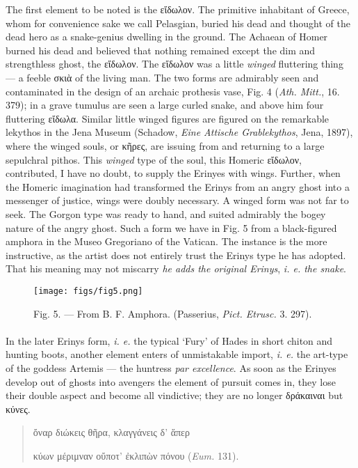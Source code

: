 \documentclass[a4paper, 11pt, oneside, polutonikogreek, english]{article}
\begin{document}
The first element to be noted is the εἴδωλον. The primitive inhabitant of Greece, whom for convenience sake we call Pelasgian, buried his dead and thought of the dead hero as a snake-genius dwelling in the ground. The Achaean of Homer burned his dead and believed that nothing remained except the dim and strengthless ghost, the εἴδωλον. The εἴδωλον was a little \emph{winged} fluttering thing --- a feeble σκιὰ of the living man. The two forms are admirably seen and contaminated in the design of an archaic prothesis vase, Fig. 4 (\emph{Ath. Mitt.}, 16. 379); in a grave tumulus are seen a large curled snake, and above him four fluttering εἴδωλα. Similar little winged figures are figured on the remarkable lekythos in the Jena Museum (Schadow, \emph{Eine Attische Grablekythos}, Jena, 1897), where the winged souls, or κῆρες, are issuing from and returning to a large sepulchral pithos. This \emph{winged} type of the soul, this Homeric εἴδωλον, contributed, I have no doubt, to supply the Erinyes with wings. Further, when the Homeric imagination had transformed the Erinys from an angry ghost into a messenger of justice, wings were doubly necessary. A winged form was not far to seek. The Gorgon type was ready to hand, and suited admirably the bogey nature of the angry ghost. Such a form we have in Fig. 5 from a black-figured amphora in the Museo Gregoriano of the Vatican. The instance is the more instructive, as the artist does not entirely trust the Erinys type he has adopted. That his meaning may not miscarry \emph{he adds the original Erinys}, \emph{i. e. the snake}.
\begin{figure}[H]
\centering
\texttt{[image: figs/fig5.png]}
\caption{Fig. 5. --- From B. F. Amphora. (Passerius, \emph{Pict. Etrusc.} 3. 297).}
\end{figure}
\paragraph{}
In the later Erinys form, \emph{i. e.} the typical `Fury' of Hades in short chiton and hunting boots, another element enters of unmistakable import, \emph{i. e.} the art-type of the goddess Artemis --- the huntress \emph{par excellence}. As soon as the Erinyes develop out of ghosts into avengers the element of pursuit comes in, they lose their double aspect and become all vindictive; they are no longer δράκαιναι but κύνες.
\begin{quotation}
ὄναρ διώκεις θῆρα, κλαγγάνεις δ' ἅπερ

κύων μέριμναν οὔποτ' ἐκλιπὼν πόνου (\emph{Eum.} 131).
\end{quotation}
\end{document}
